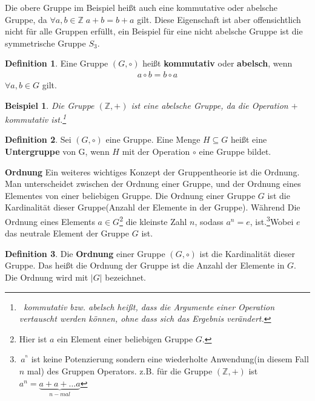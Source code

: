\documentclass[12pt,oneside]{article}
\newtheorem{example}[theorem]{Beispiel}
\theoremstyle{remark}
\theoremstyle{definition}
\newtheorem{definition}{Definition}[section]
\begin{document}
Die obere Gruppe im Beispiel heißt auch eine kommutative oder abelsche Gruppe, da $\forall a,b \in \mathbb{Z} \; a + b = b + a $ gilt. Diese Eigenschaft ist aber offensichtlich nicht für alle Gruppen erfüllt, ein Beispiel für eine nicht abelsche Gruppe ist die symmetrische Gruppe $S_3$\cite{s3}.

\begin{definition}
Eine Gruppe $(G,\circ)$ heißt \textbf{kommutativ} oder \textbf{abelsch}, wenn
\begin{align*}
    a \circ b = b \circ a  
\end{align*}
$\forall a,b \in G$ gilt.
\end{definition}

\smallskip

\begin{example}
Die Gruppe $(\mathbb{Z},+)$ ist eine abelsche Gruppe, da die Operation $+$ kommutativ ist.\footnote{$\,$ kommutativ bzw. abelsch heißt, dass die Argumente einer Operation vertauscht werden können, ohne dass sich das Ergebnis verändert.}
\end{example}

\smallskip

\begin{definition}
Sei $(G,\circ)$ eine Gruppe. Eine Menge $H \subseteq G$ heißt eine \textbf{Untergruppe} von G, wenn $H$ mit der Operation $\circ$ eine Gruppe bildet.
\end{definition}

\smallskip

\textbf{Ordnung}\newline
Ein weiteres wichtiges Konzept der Gruppentheorie ist die Ordnung. Man unterscheidet zwischen der Ordnung einer Gruppe, und der Ordnung eines Elementes von einer beliebigen Gruppe. Die Ordnung einer Gruppe $G$ ist die Kardinalität dieser Gruppe(Anzahl der Elemente in der Gruppe). Während Die Ordnung eines Elements $a \in G$\footnote{Hier ist $a$ ein Element einer beliebigen Gruppe $G$.} die kleinste Zahl $n$, sodass $a^n =e$, ist.\footnote{$\, a^^n$ ist keine Potenzierung sondern eine wiederholte Anwendung(in diesem Fall $n$ mal) des Gruppen Operators. z.B. für die Gruppe $(\mathbb{Z},+)$ ist $a^n = \underbrace{a + a + \dots a}_{n-mal}$}Wobei $e$ das neutrale Element der Gruppe $G$ ist.  




\begin{definition}
Die \textbf{Ordnung} einer Gruppe $(G, \circ)$ ist die Kardinalität dieser Gruppe. Das heißt die Ordnung der Gruppe ist die Anzahl der Elemente in $G$. Die Ordnung wird mit $|G|$ bezeichnet. 
\end{definition}
\end{document}
